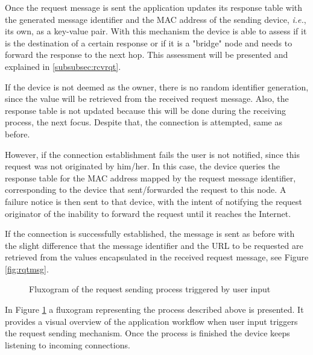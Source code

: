 Once the request message is sent the application updates its response table with the generated message identifier and the \gls{MAC} address of the sending device, \textit{i.e.}, its own, as a key-value pair. With this mechanism the device is able to assess if it is the destination of a certain response or if it is a "bridge" node and needs to forward the response to the next hop. This assessment will be presented and explained in \ref{subsubsec:rcvrqt}.

If the device is not deemed as the owner, there is no random identifier generation, since the value will be retrieved from the received request message. Also, the response table is not updated because this will be done during the receiving process, the next focus. Despite that, the connection is attempted, same as before.

However, if the connection establishment fails the user is not notified, since this request was not originated by him/her. In this case, the device queries the response table for the \gls{MAC} address mapped by the request message identifier, corresponding to the device that sent/forwarded the request to this node. A failure notice is then sent to that device, with the intent of notifying the request originator of the inability to forward the request until it reaches the Internet.

If the connection is successfully established, the message is sent as before with the slight difference that the message identifier and the \gls{URL} to be requested are retrieved from the values encapsulated in the received request message, see Figure \ref{fig:rqtmsg}.

\begin{figure}[ht]
   \noindent{}
	\caption{\label{fig:rqtflux} Fluxogram of the request sending process triggered by user input}
\end{figure}

In Figure \ref{fig:rqtflux} a fluxogram representing the process described above is presented. It provides a visual overview of the application workflow when user input triggers the request sending mechanism. Once the process is finished the device keeps listening to incoming connections.

